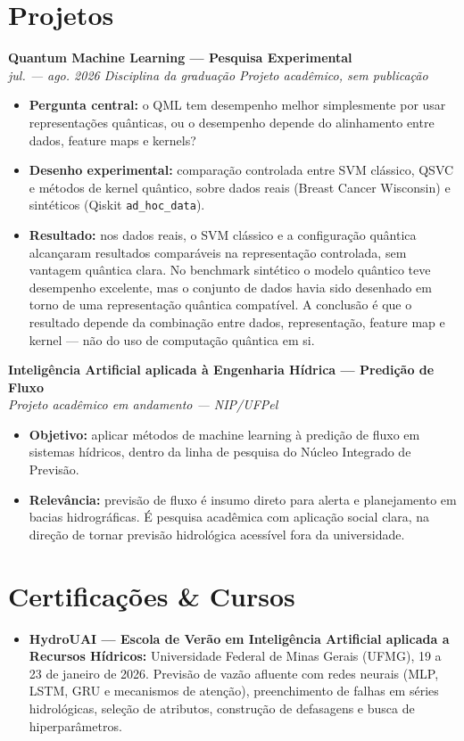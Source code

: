 \documentclass[11pt,a4paper]{article}
\newcommand{\entrada}[2]{%
  \vspace{4pt}%
  \noindent\textbf{#1}\\[1pt]%
  {\small\itshape\color{cinza} #2}\par\vspace{2pt}%
}
\begin{document}
\section*{Projetos}

\entrada{Quantum Machine Learning --- Pesquisa Experimental}
        {jul. --- ago. 2026 \textbar{} Disciplina da graduação \textbar{} Projeto acadêmico, sem publicação}
\begin{itemize}
  \item \textbf{Pergunta central:} o QML tem desempenho melhor simplesmente por
        usar representações quânticas, ou o desempenho depende do alinhamento
        entre dados, feature maps e kernels?
  \item \textbf{Desenho experimental:} comparação controlada entre SVM clássico,
        QSVC e métodos de kernel quântico, sobre dados reais (Breast Cancer
        Wisconsin) e sintéticos (Qiskit \texttt{ad\_hoc\_data}).
  \item \textbf{Resultado:} nos dados reais, o SVM clássico e a configuração
        quântica alcançaram resultados comparáveis na representação controlada,
        sem vantagem quântica clara. No benchmark sintético o modelo quântico
        teve desempenho excelente, mas o conjunto de dados havia sido desenhado
        em torno de uma representação quântica compatível. A conclusão é que o
        resultado depende da combinação entre dados, representação, feature map
        e kernel --- não do uso de computação quântica em si.
\end{itemize}

\entrada{Inteligência Artificial aplicada à Engenharia Hídrica --- Predição de Fluxo}
        {Projeto acadêmico em andamento --- NIP/UFPel}
\begin{itemize}
  \item \textbf{Objetivo:} aplicar métodos de machine learning à predição de
        fluxo em sistemas hídricos, dentro da linha de pesquisa do Núcleo
        Integrado de Previsão.
  \item \textbf{Relevância:} previsão de fluxo é insumo direto para alerta e
        planejamento em bacias hidrográficas. É pesquisa acadêmica com aplicação
        social clara, na direção de tornar previsão hidrológica acessível fora
        da universidade.
\end{itemize}

\section*{Certificações \& Cursos}
\begin{itemize}
  \item \textbf{HydroUAI --- Escola de Verão em Inteligência Artificial aplicada a
        Recursos Hídricos:} Universidade Federal de Minas Gerais (UFMG),
        19 a 23 de janeiro de 2026. Previsão de vazão afluente com redes
        neurais (MLP, LSTM, GRU e mecanismos de atenção), preenchimento de
        falhas em séries hidrológicas, seleção de atributos, construção de
        defasagens e busca de hiperparâmetros.
\end{itemize}
\end{document}
